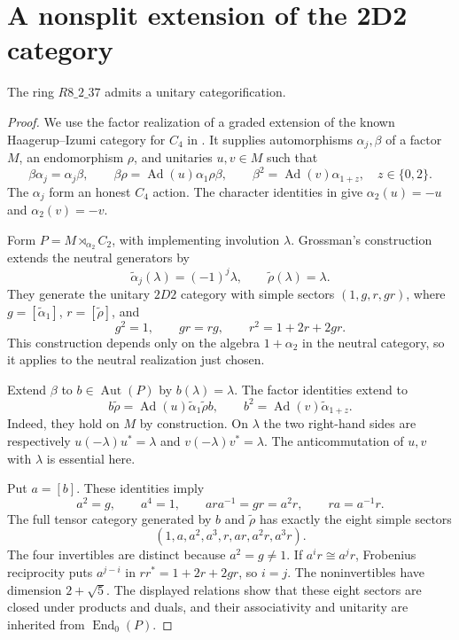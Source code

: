 \section{A nonsplit extension of the 2D2 category}
\label{sec:nonsplit-2d2}

\begin{proposition}\label{prop:r37-model}
The ring $R8\_2\_37$ admits a unitary categorification.
\end{proposition}
\begin{proof}
We use the factor realization of a graded extension of the known
Haagerup--Izumi category for $C_4$ in
\cite[Section~3 and Theorem~4.1]{GISGraded}. It supplies automorphisms
$\alpha_j,\beta$ of a factor $M$, an endomorphism $\rho$, and unitaries
$u,v\in M$ such that
\[
\beta\alpha_j=\alpha_j\beta,\qquad
\beta\rho=\operatorname{Ad}(u)\alpha_1\rho\beta,\qquad
\beta^2=\operatorname{Ad}(v)\alpha_{1+z},\quad z\in\{0,2\}.
\]
The $\alpha_j$ form an honest $C_4$ action. The character identities
in \cite[Lemma~3.2, (3.10) and (3.18)]{GISGraded} give
$\alpha_2(u)=-u$ and $\alpha_2(v)=-v$.

Form $P=M\rtimes_{\alpha_2}C_2$, with implementing involution
$\lambda$. Grossman's construction
\cite[Section~4.1]{Grossman} extends the neutral generators by
\[
\widetilde\alpha_j(\lambda)=(-1)^j\lambda,
\qquad \widetilde\rho(\lambda)=\lambda.
\]
They generate the unitary $2D2$ category with simple sectors
$(1,g,r,gr)$, where $g=[\widetilde\alpha_1]$,
$r=[\widetilde\rho]$, and
\[
g^2=1,\qquad gr=rg,\qquad r^2=1+2r+2gr.
\]
This construction depends only on the algebra $1+\alpha_2$ in the
neutral category, so it applies to the neutral realization just chosen.

Extend $\beta$ to $b\in\operatorname{Aut}(P)$ by $b(\lambda)=\lambda$.
The factor identities extend to
\[
b\widetilde\rho
 =\operatorname{Ad}(u)\widetilde\alpha_1\widetilde\rho b,
\qquad
b^2=\operatorname{Ad}(v)\widetilde\alpha_{1+z}.
\]
Indeed, they hold on $M$ by construction. On $\lambda$ the two
right-hand sides are respectively $u(-\lambda)u^*=\lambda$ and
$v(-\lambda)v^*=\lambda$. The anticommutation of $u,v$ with
$\lambda$ is essential here.

Put $a=[b]$. These identities imply
\[
a^2=g,\qquad a^4=1,\qquad ara^{-1}=gr=a^2r,
\qquad ra=a^{-1}r.
\]
The full tensor category generated by $b$ and $\widetilde\rho$ has
exactly the eight simple sectors
\[
(1,a,a^2,a^3,r,ar,a^2r,a^3r).
\]
The four invertibles are distinct because $a^2=g\ne1$. If
$a^ir\cong a^jr$, Frobenius reciprocity puts $a^{j-i}$ in
$rr^*=1+2r+2gr$, so $i=j$. The noninvertibles have dimension
$2+\sqrt5$. The displayed relations show that these eight sectors
are closed under products and duals, and their associativity and
unitarity are inherited from $\operatorname{End}_0(P)$.


\end{proof}
